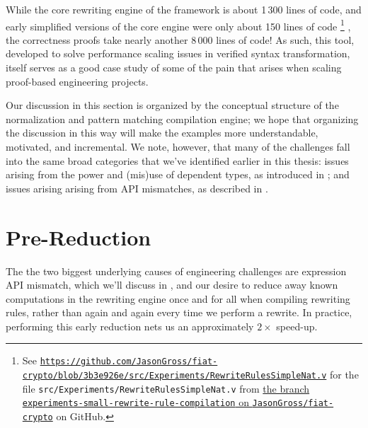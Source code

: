 While the core rewriting engine of the framework is about 1\,300 lines of code, and early simplified versions of the core engine were only about 150 lines of code%
\footnote{%
See \href{https://web.archive.org/web/20200716002534/https://github.com/JasonGross/fiat-crypto/blob/3b3e926e4186caa1a4003c81c65dad0a1c04b43d/src/Experiments/RewriteRulesSimpleNat.v}{\texttt{https://github.com/JasonGross/fiat-crypto/blob/3b3e926e/src/Experiments/RewriteRulesSimpleNat.v}} for the file \texttt{src/Experiments/RewriteRulesSimpleNat.v} from \href{https://github.com/JasonGross/fiat-crypto/tree/experiments-small-rewrite-rule-compilation}{the branch \texttt{experiments-small-rewrite-rule-compilation} on \texttt{JasonGross/fiat-crypto}} on GitHub.%
}%
, the correctness proofs take nearly another 8\,000 lines of code!
As such, this tool, developed to solve performance scaling issues in verified syntax transformation, itself serves as a good case study of some of the pain that arises when scaling proof-based engineering projects.

Our discussion in this section is organized by the conceptual structure of the normalization and pattern matching compilation engine;
we hope that organizing the discussion in this way will make the examples more understandable, motivated, and incremental.
We note, however, that many of the challenges fall into the same broad categories that we've identified earlier in this thesis:
issues arising from the power and (mis)use of dependent types, as introduced in ;
and issues arising arising from API mismatches, as described in .

\section{Pre-Reduction}\label{sec:rewriting-more:pre-reduction}
The the two biggest underlying causes of engineering challenges are expression API mismatch, which we'll discuss in , and our desire to reduce away known computations in the rewriting engine once and for all when compiling rewriting rules, rather than again and again every time we perform a rewrite.
In practice, performing this early reduction nets us an approximately $2\times$ speed-up.

